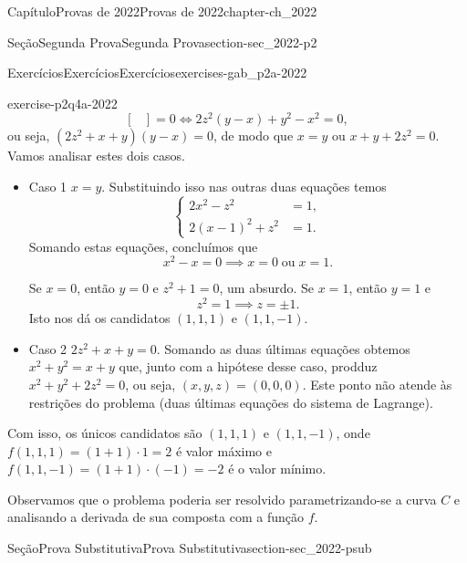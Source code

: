 \documentclass[oneside,10pt,]{book}
\numberwithin{equation}{section}
\begin{document}
\begin{chapterptx}{Capítulo}{Provas de 2022}{}{Provas de 2022}{}{}{chapter-ch_2022}
\begin{sectionptx}{Seção}{Segunda Prova}{}{Segunda Prova}{}{}{section-sec_2022-p2}
\begin{exercises-subsection-numberless}{Exercícios}{Exercícios}{}{Exercícios}{}{}{exercises-gab_p2a-2022}
\begin{divisionexercise}{4}{}{}{exercise-p2q4a-2022}
\begin{equation*}
\begin{bmatrix}
\end{bmatrix} = 0 \iff 2z^2(y-x)+y^2 - x^2 = 0,
\end{equation*}
ou seja, \((2z^2 + x+ y)(y-x)=0\), de modo que \(x=y\) ou \(x+y+2z^2=0\). Vamos analisar estes dois casos.%
%
\begin{itemize}[label=\textbullet]
\item{}Caso 1 \(x=y\). Substituindo isso nas outras duas equações temos%
\begin{equation*}
\begin{cases}
2x^2 - z^2 &= 1,\\
2(x-1)^2 + z^2 &= 1.
\end{cases}
\end{equation*}
Somando estas equações, concluímos que%
\begin{equation*}
x^2 - x = 0
\implies x = 0\; \text{ou}\; x = 1.
\end{equation*}
%
\par
Se \(x=0\), então \(y=0\) e \(z^2 + 1 = 0\), um absurdo. Se \(x=1\), então \(y=1\) e%
\begin{equation*}
z^2 = 1 \implies
z = \pm 1.
\end{equation*}
Isto nos dá os candidatos \((1,1,1)\) e \((1,1,-1)\).%
\item{}Caso 2 \(2z^2+x+y=0\). Somando as duas últimas equações obtemos \(x^2+y^2=x+y\) que, junto com a hipótese desse caso, prodduz \(x^2+y^2+2z^2=0\), ou seja, \((x,y,z)=(0,0,0)\). Este ponto não atende às restrições do problema (duas últimas equações do sistema de Lagrange).%
\end{itemize}
Com isso, os únicos candidatos são \((1,1,1)\) e \((1,1,-1)\), onde \(f(1,1,1)=(1+1)\cdot 1=2\) é valor máximo e \(f(1,1,-1)=(1+1)\cdot (-1)=-2\) é o valor mínimo.%
\par
Observamos que o problema poderia ser resolvido parametrizando-se a curva \(C\) e analisando a derivada de sua composta com a função \(f\).%
\end{divisionexercise}%
\end{exercises-subsection-numberless}
\end{sectionptx}
%
%
\typeout{************************************************}
\typeout{************************************************}
%
\begin{sectionptx}{Seção}{Prova Substitutiva}{}{Prova Substitutiva}{}{}{section-sec_2022-psub}
%
%
\typeout{************************************************}
\typeout{************************************************}

\end{sectionptx}
\end{chapterptx}
\end{document}
